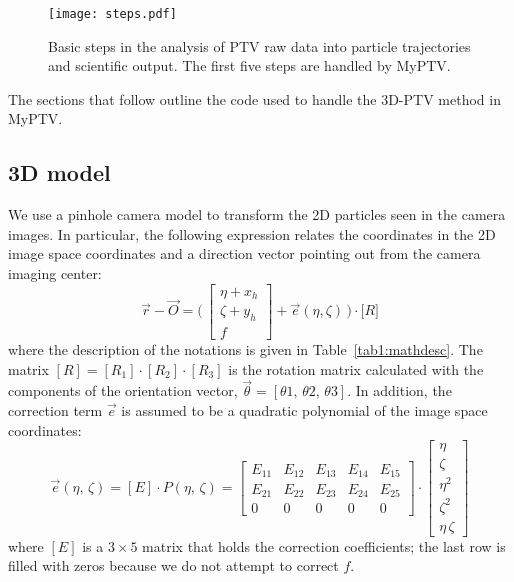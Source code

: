 \documentclass[10pt,a4paper]{article}
\begin{document}
\begin{figure}
	\centering
	\texttt{[image: steps.pdf]}
	\caption{Basic steps in the analysis of PTV raw data into particle trajectories and scientific output. The first five steps are handled by MyPTV. \label{fig:steps}}
\end{figure}


The sections that follow outline the code used to handle the 3D-PTV method in MyPTV.





\subsection{3D model}


We use a pinhole camera model to transform the 2D particles seen in the camera images. In particular, the following expression relates the coordinates in the 2D image space coordinates and a direction vector pointing out from the camera imaging center:
%
\begin{equation}
\vec{r}-\vec{O} = \Big( \, 
\begin{bmatrix}
\eta + x_h\\
\zeta + y_h \\
f
\end{bmatrix}
+ \vec{e}(\eta, \zeta) \,\Big) \cdot \Big[ R \Big]
\label{eq:3dmodel}
\end{equation}
%
where the description of the notations is given in Table~\ref{tab1:mathdesc}. The matrix $[R]= [R_1]\cdot [R_2] \cdot [R_3]$ is the rotation matrix calculated with the components of the orientation vector, $\vec{\theta} = [\theta 1,\, \theta 2,\, \theta 3]$. In addition, the correction term $\vec{e}$ is assumed to be a quadratic polynomial of the image space coordinates:
%
\begin{equation}
\vec{e}(\eta,\,\zeta) = [E]\cdot P(\eta,\,\zeta) =
\begin{bmatrix}
E_{11} & E_{12} & E_{13} & E_{14} & E_{15}\\
E_{21} & E_{22} & E_{23} & E_{24} & E_{25}\\
0 & 0 & 0 & 0 & 0
\end{bmatrix}
\cdot 
\begin{bmatrix}
\eta\\
\zeta\\
\eta^2\\
\zeta^2\\
\eta\,\zeta
\end{bmatrix}
\end{equation}
%
where $[E]$ is a $3\times5$ matrix that holds the correction coefficients; the last row is filled with zeros because we do not attempt to correct $f$.
\end{document}
